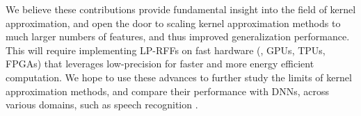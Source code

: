 

We believe these contributions provide fundamental insight into the field of kernel approximation, and open the door to scaling kernel approximation methods to much larger numbers of features, and thus improved generalization performance. This will require implementing LP-RFFs on fast hardware (\eg, GPUs, TPUs, FPGAs) that leverages low-precision for faster and more energy efficient computation.  We hope to use these advances to further study the limits of kernel approximation methods, and compare their performance with DNNs, across various domains, such as speech recognition \citep{may2017}.